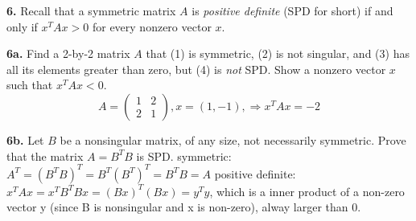 \documentclass[11pt]{article}
\begin{document}
\par\bigskip
{\bf 6.} Recall that a symmetric matrix $A$ is {\em positive definite}
(SPD for short) if and only if $x^TAx>0$ for every nonzero vector $x$.

\par\medskip
{\bf 6a.} Find a 2-by-2 matrix $A$ that (1) is symmetric, (2) is not singular,
and (3) has all its elements greater than zero, but (4) is {\em not} SPD.
Show a nonzero vector $x$ such that $x^TAx<0$.
$$A=\left(\begin{array}{cc}
	1&2\\
	2&1
\end{array}\right), x=(1,-1),\Rightarrow x^TAx=-2$$
\par\medskip
{\bf 6b.} Let $B$ be a nonsingular matrix, of any size, 
not necessarily symmetric.
Prove that the matrix $A=B^TB$ is SPD.\newline\newline
symmetric: $A^T=(B^TB)^T=B^T(B^T)^T=B^TB=A$\newline
positive definite: $x^TAx=x^TB^TBx=(Bx)^T(Bx)=y^Ty$, which is a inner product of a non-zero vector y (since B is nonsingular and x is non-zero), alway larger than 0.
\end{document}
